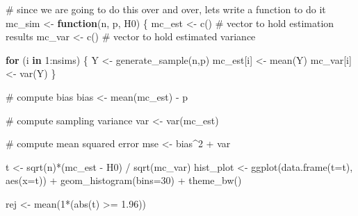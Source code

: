 \documentclass[
  letterpaper,
  DIV=11,
  numbers=noendperiod]{scrreprt}
\newenvironment{Shaded}{\begin{snugshade}}{\end{snugshade}}
\newcommand{\AttributeTok}[1]{\textcolor[rgb]{0.40,0.45,0.13}{#1}}
\newcommand{\CommentTok}[1]{\textcolor[rgb]{0.37,0.37,0.37}{#1}}
\newcommand{\ControlFlowTok}[1]{\textcolor[rgb]{0.00,0.23,0.31}{\textbf{#1}}}
\newcommand{\DecValTok}[1]{\textcolor[rgb]{0.68,0.00,0.00}{#1}}
\newcommand{\FloatTok}[1]{\textcolor[rgb]{0.68,0.00,0.00}{#1}}
\newcommand{\FunctionTok}[1]{\textcolor[rgb]{0.28,0.35,0.67}{#1}}
\newcommand{\NormalTok}[1]{\textcolor[rgb]{0.00,0.23,0.31}{#1}}
\newcommand{\OtherTok}[1]{\textcolor[rgb]{0.00,0.23,0.31}{#1}}
\newcommand{\SpecialCharTok}[1]{\textcolor[rgb]{0.37,0.37,0.37}{#1}}
\begin{document}
\begin{Shaded}
\begin{Highlighting}[]
\CommentTok{\# since we are going to do this over and over, let\textquotesingle{}s write a function to do it}
\NormalTok{mc\_sim }\OtherTok{\textless{}{-}} \ControlFlowTok{function}\NormalTok{(n, p, H0) \{}
\NormalTok{  mc\_est }\OtherTok{\textless{}{-}} \FunctionTok{c}\NormalTok{()  }\CommentTok{\# vector to hold estimation results}
\NormalTok{  mc\_var }\OtherTok{\textless{}{-}} \FunctionTok{c}\NormalTok{()  }\CommentTok{\# vector to hold estimated variance}

  \ControlFlowTok{for}\NormalTok{ (i }\ControlFlowTok{in} \DecValTok{1}\SpecialCharTok{:}\NormalTok{nsims) \{}
\NormalTok{    Y }\OtherTok{\textless{}{-}} \FunctionTok{generate\_sample}\NormalTok{(n,p)}
\NormalTok{    mc\_est[i] }\OtherTok{\textless{}{-}} \FunctionTok{mean}\NormalTok{(Y)}
\NormalTok{    mc\_var[i] }\OtherTok{\textless{}{-}} \FunctionTok{var}\NormalTok{(Y)}
\NormalTok{  \}}

  \CommentTok{\# compute bias}
\NormalTok{  bias }\OtherTok{\textless{}{-}} \FunctionTok{mean}\NormalTok{(mc\_est) }\SpecialCharTok{{-}}\NormalTok{ p}

  \CommentTok{\# compute sampling variance}
\NormalTok{  var }\OtherTok{\textless{}{-}} \FunctionTok{var}\NormalTok{(mc\_est)}

  \CommentTok{\# compute mean squared error}
\NormalTok{  mse }\OtherTok{\textless{}{-}}\NormalTok{ bias}\SpecialCharTok{\^{}}\DecValTok{2} \SpecialCharTok{+}\NormalTok{ var}

\NormalTok{  t }\OtherTok{\textless{}{-}} \FunctionTok{sqrt}\NormalTok{(n)}\SpecialCharTok{*}\NormalTok{(mc\_est }\SpecialCharTok{{-}}\NormalTok{ H0) }\SpecialCharTok{/} \FunctionTok{sqrt}\NormalTok{(mc\_var)}
\NormalTok{  hist\_plot }\OtherTok{\textless{}{-}} \FunctionTok{ggplot}\NormalTok{(}\FunctionTok{data.frame}\NormalTok{(}\AttributeTok{t=}\NormalTok{t), }\FunctionTok{aes}\NormalTok{(}\AttributeTok{x=}\NormalTok{t)) }\SpecialCharTok{+}
    \FunctionTok{geom\_histogram}\NormalTok{(}\AttributeTok{bins=}\DecValTok{30}\NormalTok{) }\SpecialCharTok{+}
    \FunctionTok{theme\_bw}\NormalTok{()}

\NormalTok{  rej }\OtherTok{\textless{}{-}} \FunctionTok{mean}\NormalTok{(}\DecValTok{1}\SpecialCharTok{*}\NormalTok{(}\FunctionTok{abs}\NormalTok{(t) }\SpecialCharTok{\textgreater{}=} \FloatTok{1.96}\NormalTok{))}


\end{Highlighting}
\end{Shaded}
\end{document}
